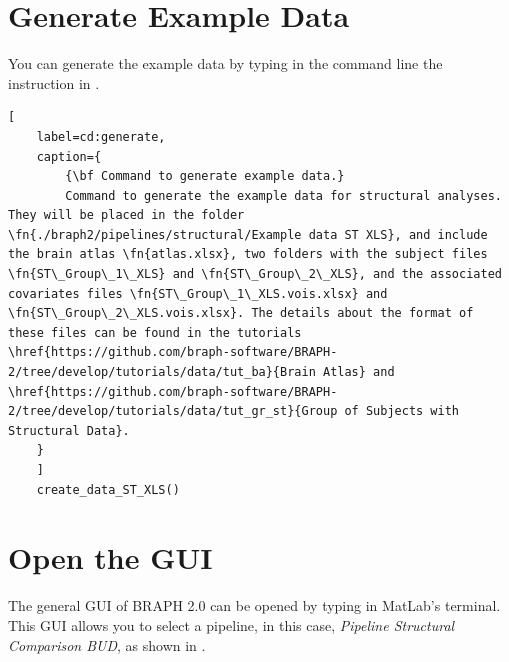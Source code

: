 \documentclass[justified]{tufte-handout}
\begin{document}
\begin{abstract}
\noindent
In this tutorial, you will upload a file containing the pipeline with the different steps to compare two groups of subjects using \emph{structural data} (check tutorial \href{https://github.com/braph-software/BRAPH-2/tree/develop/tutorials/data/tut_gr_st}{Group of Subjects with Structural Data}) and binarized undirected graphs. This tutorial explains how to perform group analyses and comparisons with this kind of data at fixed densities.
\end{abstract}


\tableofcontents

\clearpage

\section{Generate Example Data}

You can generate the example data by typing in the command line the instruction in .

\begin{lstlisting}[
	label=cd:generate,
	caption={
		{\bf Command to generate example data.}
		Command to generate the example data for structural analyses. They will be placed in the folder \fn{./braph2/pipelines/structural/Example data ST XLS}, and include the brain atlas \fn{atlas.xlsx}, two folders with the subject files \fn{ST\_Group\_1\_XLS} and \fn{ST\_Group\_2\_XLS}, and the associated covariates files \fn{ST\_Group\_1\_XLS.vois.xlsx} and \fn{ST\_Group\_2\_XLS.vois.xlsx}. The details about the format of these files can be found in the tutorials \href{https://github.com/braph-software/BRAPH-2/tree/develop/tutorials/data/tut_ba}{Brain Atlas} and \href{https://github.com/braph-software/BRAPH-2/tree/develop/tutorials/data/tut_gr_st}{Group of Subjects with Structural Data}.
	}
	]
	create_data_ST_XLS()
\end{lstlisting}


\section{Open the GUI}

The general GUI of BRAPH 2.0 can be opened by typing  in MatLab's terminal. This GUI allows you to select a pipeline, in this case, \emph{Pipeline Structural Comparison BUD}, as shown in .
\end{document}
